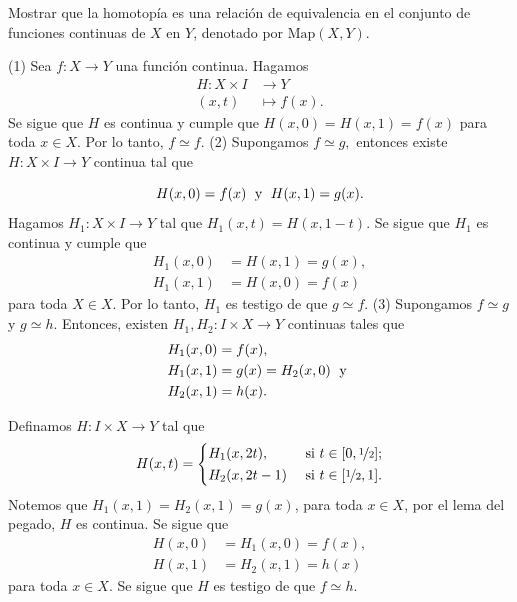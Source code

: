 \begin{ejercicio}
        Mostrar que la homotopía es una relación de equivalencia en el conjunto de funciones continuas de $X$ en $Y$, denotado por $\text{Map}(X,Y)$.
    \end{ejercicio}

\begin{demostracion}
(1) Sea $f: X\to Y$ una función continua. Hagamos 
\begin{align*}
    H:X\times I&\to Y\\
    (x,t)&\mapsto f(x).
\end{align*}
Se sigue que $H$ es continua y cumple que $H(x,0)=H(x,1)=f(x)$ para toda $x\in X$. Por lo tanto, $f\simeq f$. (2) Supongamos $f\simeq g,$ entonces existe $H:X\times I\to Y$ continua tal que 

$$H(x,0)=f(x)\text{\; y\; } H(x,1)=g(x).$$
Hagamos $H_1:X\times I\to Y$ tal que $H_1(x,t)=H(x,1-t)$. Se sigue que $H_1$ es continua y cumple que 
\begin{align*}
    H_1(x,0)&=H(x,1)=g(x),\\
    H_1(x,1)&=H(x,0)=f(x)
\end{align*}
para toda $X\in X$. Por lo tanto, $H_1$ es testigo de que $g\simeq f$. (3) Supongamos $f\simeq g$ y $g\simeq h$. Entonces, existen $H_1,H_2:I\times X\to Y$ continuas tales que
\begin{align*}
    H_1(x,0)&=f(x),\\
    H_1(x,1)&=g(x)=H_2(x,0)\text{\; y }\\
    H_2(x,1)&=h(x).
\end{align*}

Definamos $H:I\times X\to Y$ tal que
\begin{equation*}
    H(x,t)=\begin{cases}
        H_1(x,2t), & \text{ si } t\in[0,\nicefrac{1}{2}];\\[0.25ex]
        H_2(x,2t-1) & \text{ si } t\in [\nicefrac{1}{2},1].
    \end{cases}
\end{equation*}
Notemos que $H_1(x,1)=H_2(x,1)=g(x)$, para toda $x\in X$, por el lema del pegado, $H$ es continua. Se sigue que 
\begin{align*}
    H(x,0)&=H_1(x,0)=f(x),\\
    H(x,1)&=H_2(x,1)=h(x)
\end{align*}
para toda $x\in X$. Se sigue que $H$ es testigo de que $f\simeq h$.
\end{demostracion}
